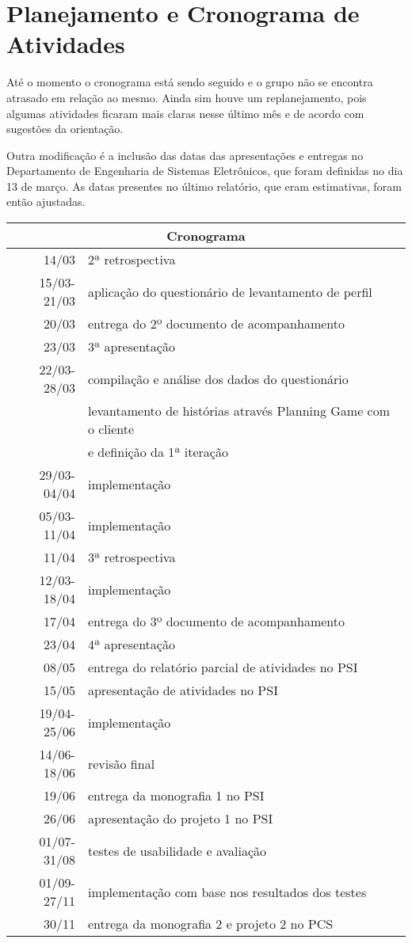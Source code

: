 \documentclass[a4paper,12pt,font=plain,header=plain]{abnt}
\begin{document}
  \section{Planejamento e Cronograma de Atividades}

    Até o momento o cronograma está sendo seguido e o grupo não se encontra atrasado em relação ao mesmo. Ainda sim houve um replanejamento, pois algumas atividades ficaram mais claras nesse último mês e de acordo com sugestões da orientação.

    Outra modificação é a inclusão das datas das apresentações e entregas no Departamento de Engenharia de Sistemas Eletrônicos, que foram definidas no dia 13 de março. As datas presentes no último relatório, que eram estimativas, foram então ajustadas.

		\begin{tabular}[|l|]{ |r|l| }
		\hline
			\multicolumn{2}{|c|}{\large{Cronograma}} \\
		\hline
			14/03 & 2ª retrospectiva \\
		\hline
			15/03-21/03 & aplicação do questionário de levantamento de perfil \\
		\hline
			20/03 & entrega do 2º documento de acompanhamento \\
		\hline
			23/03 & 3ª apresentação \\
		\hline
			22/03-28/03 & compilação e análise dos dados do questionário \\
			 & levantamento de histórias através Planning Game com o cliente \\
			 & e definição da 1ª iteração \\
		\hline
			29/03-04/04 & implementação \\
		\hline
			05/03-11/04 & implementação \\
		\hline
			11/04 & 3ª retrospectiva \\
		\hline
			12/03-18/04 & implementação \\
		\hline
			17/04 & entrega do 3º documento de acompanhamento \\
		\hline
			23/04 & 4ª apresentação \\
    \hline
      08/05 & entrega do relatório parcial de atividades no PSI \\
    \hline
      15/05 & apresentação de atividades no PSI \\
		\hline
			19/04-25/06 & implementação \\
		\hline
			14/06-18/06 & revisão final \\
		\hline
			19/06 & entrega da monografia 1 no PSI \\
		\hline
			26/06 & apresentação do projeto 1 no PSI \\
		\hline
			01/07-31/08 & testes de usabilidade e avaliação \\
		\hline
			01/09-27/11 & implementação com base nos resultados dos testes \\
		\hline
			30/11 & entrega da monografia 2 e projeto 2 no PCS \\
		\hline
		\end{tabular} \\
\end{document}
